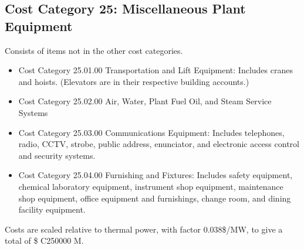 \subsection{Cost Category 25: Miscellaneous Plant Equipment}  %

Consists of items not in the other cost categories.

\begin{itemize}

\item Cost Category 25.01.00 Transportation and Lift Equipment: Includes cranes and hoists. (Elevators are in their respective building accounts.)

\item  Cost Category 25.02.00 Air, Water, Plant Fuel Oil, and Steam Service Systems

\item  Cost Category 25.03.00 Communications Equipment: Includes telephones, radio, CCTV, strobe, public address, enunciator, and electronic access control and security systems.

\item  Cost Category 25.04.00 Furnishing and Fixtures: Includes safety equipment, chemical laboratory equipment, instrument shop equipment, maintenance shop equipment, office equipment and furnishings, change room, and dining facility equipment.

\end{itemize}

Costs are scaled relative to thermal power, with factor 0.038\$/MW, to give a total of \$ C250000 M. 

